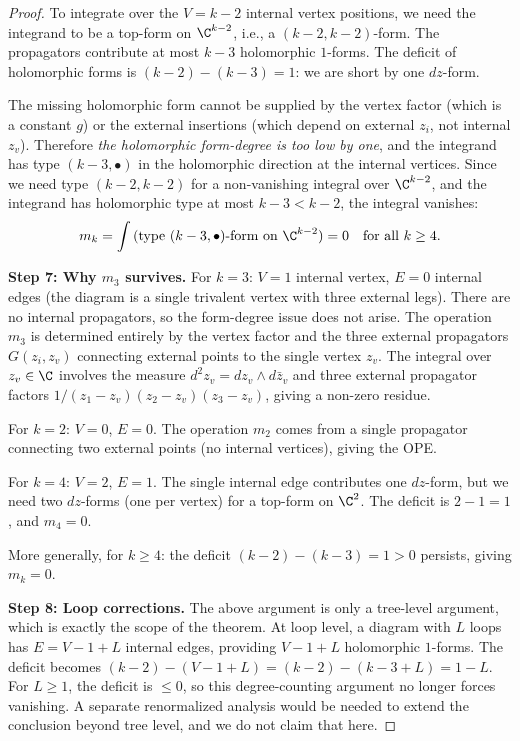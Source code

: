 \begin{proof}
To integrate over the $V = k - 2$ internal vertex positions, we need the integrand to be a top-form on $\C^{k-2}$, i.e., a $(k-2, k-2)$-form. The propagators contribute at most $k-3$ holomorphic $1$-forms. The deficit of holomorphic forms is $(k-2) - (k-3) = 1$: we are short by one $dz$-form.

The missing holomorphic form cannot be supplied by the vertex factor (which is a constant $g$) or the external insertions (which depend on external $z_i$, not internal $z_v$). Therefore \emph{the holomorphic form-degree is too low by one}, and the integrand has type $(k-3, \bullet)$ in the holomorphic direction at the internal vertices. Since we need type $(k-2, k-2)$ for a non-vanishing integral over $\C^{k-2}$, and the integrand has holomorphic type at most $k-3 < k-2$, the integral vanishes:
\[
m_k = \int \text{(type $(k-3,\bullet)$-form on $\C^{k-2}$)} = 0 \quad \text{for all } k \geq 4.
\]

\textbf{Step 7: Why $m_3$ survives.}
For $k = 3$: $V = 1$ internal vertex, $E = 0$ internal edges (the diagram is a single trivalent vertex with three external legs). There are no internal propagators, so the form-degree issue does not arise. The operation $m_3$ is determined entirely by the vertex factor and the three external propagators $G(z_i, z_v)$ connecting external points to the single vertex $z_v$. The integral over $z_v \in \C$ involves the measure $d^2z_v = dz_v \wedge d\bar{z}_v$ and three external propagator factors $1/(z_1 - z_v)(z_2 - z_v)(z_3 - z_v)$, giving a non-zero residue.

For $k = 2$: $V = 0$, $E = 0$. The operation $m_2$ comes from a single propagator connecting two external points (no internal vertices), giving the OPE.

For $k = 4$: $V = 2$, $E = 1$. The single internal edge contributes one $dz$-form, but we need two $dz$-forms (one per vertex) for a top-form on $\C^2$. The deficit is $2 - 1 = 1$, and $m_4 = 0$.

More generally, for $k \geq 4$: the deficit $(k-2) - (k-3) = 1 > 0$ persists, giving $m_k = 0$.

\textbf{Step 8: Loop corrections.}
The above argument is only a tree-level argument, which is exactly the
scope of the theorem. At loop level, a diagram with $L$ loops has
$E = V - 1 + L$ internal edges, providing $V - 1 + L$ holomorphic
$1$-forms. The deficit becomes
$(k-2) - (V-1+L) = (k-2) - (k-3+L) = 1 - L$. For $L \geq 1$, the
deficit is $\leq 0$, so this degree-counting argument no longer forces
vanishing. A separate renormalized analysis would be needed to extend
the conclusion beyond tree level, and we do not claim that here.
\end{proof}

